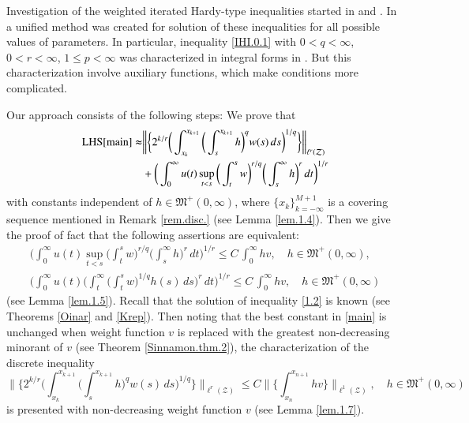 \documentclass[12pt]{amsart}
\theoremstyle{plain}
\theoremstyle{definition}
\numberwithin{thm}{section}
\numberwithin{equation}{section}
\begin{document}
Investigation of the weighted iterated Hardy-type inequalities started in \cite{GogMusPers1} and \cite{GogMusPers2}. In \cite{ProkhStep1} a unified method was created for solution of these inequalities for all possible values of parameters. In particular, inequality \eqref{IHI.0.1} with $0<q<\infty$, $0 < r < \infty$, $1 \le p < \infty$ was characterized in integral forms in \cite{ProkhStep1}. But this characterization involve auxiliary functions, which make conditions more complicated. 

Our approach consists of the following steps: We prove that
\begin{align*}
	{\operatorname{LHS}}{\eqref{main}} \thickapprox &  \bigg\| \bigg\{ 2^{k / r} \bigg(
	\int_{x_k}^{x_{k+1}} \bigg( \int_s^{x_{k+1}} h \bigg)^q
	w(s)\,ds\bigg)^{ 1 / q} \bigg\} \bigg\|_{\ell^r({\mathcal Z})}  \\
	&  +  \bigg( \int_0^{\infty}  u(t) \sup_{t < s} \bigg(
	\int_t^s w \bigg)^{r / q} \bigg( \int_s^{\infty} h\bigg)^r \,dt\bigg)^{1/r} 
\end{align*}
with constants independent of $h \in {\mathfrak M}^+(0,\infty)$, where  $\{x_k\}_{k=-\infty}^{M + 1}$ is a covering sequence mentioned in Remark \ref{rem.disc.} (see Lemma \ref{lem.1.4}). 
Then we give the proof of fact that the following assertions are equivalent:
\begin{align}
	\bigg( \int_0^{\infty}  u(t) \sup_{t < s} \bigg(
	\int_t^s w \bigg)^{r / q} \bigg( \int_s^{\infty} h\bigg)^r \,dt\bigg)^{1/r} \leq C \, \int_0^{\infty} h v, \quad h \in {\mathfrak M}^+(0,\infty), \label{1.1} \\
	\bigg( \int_0^{\infty}  u(t) \bigg( \int_t^{\infty} \bigg(
	\int_t^s w \bigg)^{1 / q}  h(s) \,ds\bigg)^r \,dt\bigg)^{1/r} \leq C \,\int_0^{\infty} h v, \quad h \in {\mathfrak M}^+(0,\infty) \label{1.2}
\end{align}
(see Lemma \ref{lem.1.5}). Recall that the solution of inequality \eqref{1.2} is known (see Theorems \ref{Oinar} and \ref{Krep}). 
Then noting that the best constant in \eqref{main} is unchanged when weight function $v$ is replaced with the greatest non-decreasing minorant of $v$ (see Theorem \ref{Sinnamon.thm.2}), the characterization of the discrete inequality
\begin{equation*}
	\bigg\| \bigg\{ 2^{k / r} \bigg( \int_{x_k}^{x_{k+1}} \bigg( \int_s^{x_{k+1}} h \bigg)^q
	w(s)\,ds\bigg)^{ 1 / q} \bigg\} \bigg\|_{\ell^r({\mathcal Z})} \le C \bigg\| \bigg\{ \int_{x_n}^{x_{n+1}} h v \bigg\} \bigg\|_{\ell^1 ({\mathcal Z})}, \quad h \in {\mathfrak M}^+(0,\infty) 
\end{equation*}
is presented with non-decreasing weight function $v$ (see Lemma \ref{lem.1.7}).
\end{document}
